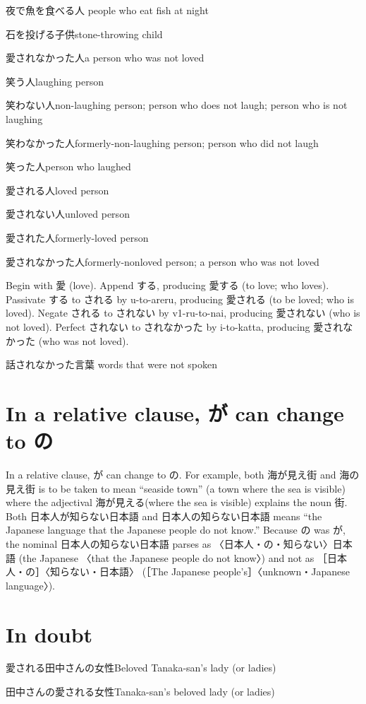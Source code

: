夜で魚を食べる人
people who eat fish at night

石を投げる子供stone-throwing child

愛されなかった人a person who was not loved

笑う人laughing person

笑わない人non-laughing person; person who does not laugh; person who is not laughing

笑わなかった人formerly-non-laughing person; person who did not laugh

笑った人person who laughed

愛される人loved person

愛されない人unloved person

愛された人formerly-loved person

愛されなかった人formerly-nonloved person; a person who was not loved

Begin with 愛 (love).
Append する, producing 愛する (to love; who loves).
Passivate する to される by u-to-areru, producing 愛される (to be loved; who is loved).
Negate される to されない by v1-ru-to-nai, producing 愛されない (who is not loved).
Perfect されない to されなかった by i-to-katta, producing 愛されなかった (who was not loved).

話されなかった言葉
words that were not spoken

\section{In a relative clause, が can change to の}

In a relative clause, が can change to の.
For example, both 海が見え街 and 海の見え街 is to be taken to mean
``seaside town'' (a town where the sea is visible)
where the adjectival 海が見える(where the sea is visible) explains the noun 街.
Both 日本人が知らない日本語
and 日本人の知らない日本語
means ``the Japanese language that the Japanese people do not know.''
Because の was が, the nominal 日本人の知らない日本語 parses as
〈日本人・の・知らない〉日本語 (the Japanese 〈that the Japanese people do not know〉)
and not as
［日本人・の］〈知らない・日本語〉
(［The Japanese people's］〈unknown・Japanese language〉).

\section{In doubt}

愛される田中さんの女性Beloved Tanaka-san's lady (or ladies)

田中さんの愛される女性Tanaka-san's beloved lady (or ladies)
